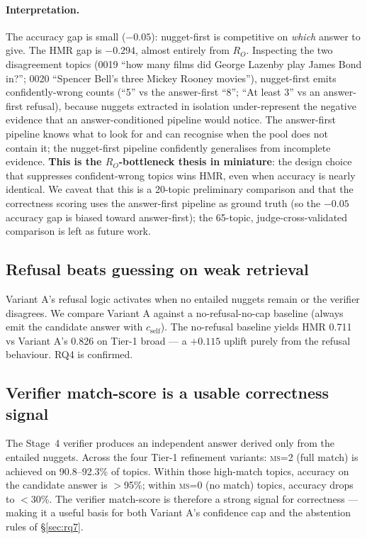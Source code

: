 \documentclass[11pt,a4paper]{article}
\newcommand{\HMR}{\textsc{HMR}}
\begin{document}
\paragraph{Interpretation.} The accuracy gap is small ($-0.05$):
nugget-first is competitive on \emph{which} answer to give. The HMR
gap is $-0.294$, almost entirely from $R_O$. Inspecting the two
disagreement topics (0019 ``how many films did George Lazenby play
James Bond in?''; 0020 ``Spencer Bell's three Mickey Rooney movies''),
nugget-first emits confidently-wrong counts (``5'' vs the
answer-first ``8''; ``At least 3'' vs an answer-first refusal),
because nuggets extracted in isolation under-represent the negative
evidence that an answer-conditioned pipeline would notice. The
answer-first pipeline knows what to look for and can recognise when
the pool does not contain it; the nugget-first pipeline confidently
generalises from incomplete evidence. \textbf{This is the
$R_O$-bottleneck thesis in miniature}: the design choice that
suppresses confident-wrong topics wins HMR, even when accuracy is
nearly identical. We caveat that this is a 20-topic preliminary
comparison and that the correctness scoring uses the answer-first
pipeline as ground truth (so the $-0.05$ accuracy gap is biased
toward answer-first); the 65-topic, judge-cross-validated comparison
is left as future work.

\subsection{Refusal beats guessing on weak retrieval}\label{sec:rq4}

Variant A's refusal logic activates when no entailed nuggets remain
or the verifier disagrees. We compare Variant A against a
no-refusal-no-cap baseline (always emit the candidate answer with
$c_{\text{self}}$). The no-refusal baseline yields \HMR{} 0.711 vs
Variant A's 0.826 on Tier-1 broad — a $+0.115$ uplift purely from the
refusal behaviour. RQ4 is confirmed.

\subsection{Verifier match-score is a usable correctness signal}\label{sec:rq5}

The Stage~4 verifier produces an independent answer derived only from
the entailed nuggets. Across the four Tier-1 refinement variants:
\textsc{ms}=2 (full match) is achieved on 90.8–92.3\% of topics.
Within those high-match topics, accuracy on the candidate answer is
$>$95\%; within \textsc{ms}=0 (no match) topics, accuracy drops to
$<$30\%. The verifier match-score is therefore a strong signal for
correctness — making it a useful basis for both Variant A's
confidence cap and the abstention rules of \S\ref{sec:rq7}.
\end{document}
